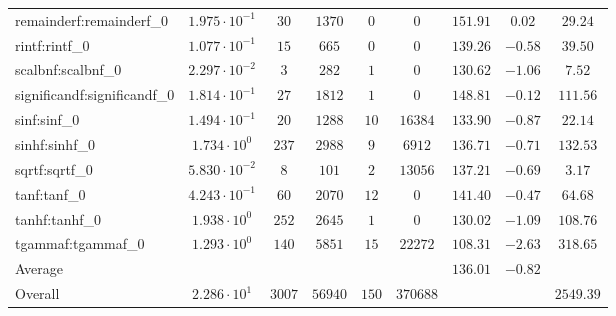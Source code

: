 \begin{tabular}{|l|c|c|c|c|c|c|c|c|}
remainderf:remainderf\_0     & $ 1.975 \cdot 10^{-1} $ & $ 30     $ & $ 1370  $ & $ 0   $ & $ 0      $ & $ 151.91      $ & $ 0.02    $ & $ 29.24   $ \\
rintf:rintf\_0               & $ 1.077 \cdot 10^{-1} $ & $ 15     $ & $ 665   $ & $ 0   $ & $ 0      $ & $ 139.26      $ & $ -0.58   $ & $ 39.50   $ \\
scalbnf:scalbnf\_0           & $ 2.297 \cdot 10^{-2} $ & $ 3      $ & $ 282   $ & $ 1   $ & $ 0      $ & $ 130.62      $ & $ -1.06   $ & $ 7.52    $ \\
significandf:significandf\_0 & $ 1.814 \cdot 10^{-1} $ & $ 27     $ & $ 1812  $ & $ 1   $ & $ 0      $ & $ 148.81      $ & $ -0.12   $ & $ 111.56  $ \\
sinf:sinf\_0                 & $ 1.494 \cdot 10^{-1} $ & $ 20     $ & $ 1288  $ & $ 10  $ & $ 16384  $ & $ 133.90      $ & $ -0.87   $ & $ 22.14   $ \\
sinhf:sinhf\_0               & $ 1.734 \cdot 10^{0}  $ & $ 237    $ & $ 2988  $ & $ 9   $ & $ 6912   $ & $ 136.71      $ & $ -0.71   $ & $ 132.53  $ \\
sqrtf:sqrtf\_0               & $ 5.830 \cdot 10^{-2} $ & $ 8      $ & $ 101   $ & $ 2   $ & $ 13056  $ & $ 137.21      $ & $ -0.69   $ & $ 3.17    $ \\
tanf:tanf\_0                 & $ 4.243 \cdot 10^{-1} $ & $ 60     $ & $ 2070  $ & $ 12  $ & $ 0      $ & $ 141.40      $ & $ -0.47   $ & $ 64.68   $ \\
tanhf:tanhf\_0               & $ 1.938 \cdot 10^{0}  $ & $ 252    $ & $ 2645  $ & $ 1   $ & $ 0      $ & $ 130.02      $ & $ -1.09   $ & $ 108.76  $ \\
tgammaf:tgammaf\_0           & $ 1.293 \cdot 10^{0}  $ & $ 140    $ & $ 5851  $ & $ 15  $ & $ 22272  $ & $ 108.31      $ & $ -2.63   $ & $ 318.65  $ \\
\hline
Average                      & $                     $ & $        $ & $       $ & $     $ & $        $ & $ 136.01      $ & $ -0.82   $ & $         $ \\
\hline
Overall                      & $ 2.286 \cdot 10^{1}  $ & $ 3007   $ & $ 56940 $ & $ 150 $ & $ 370688 $ & $             $ & $         $ & $ 2549.39 $ \\
\hline
\end{tabular}
